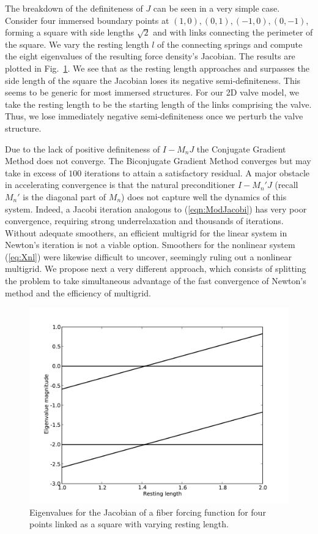 \documentclass[preprint,12pt]{elsarticle}
\begin{document}
The breakdown of the definiteness of $J$ can be seen in a very simple case. Consider four immersed boundary points at $(1,0),(0,1),(-1,0),(0,-1)$, forming a square with side lengths $\sqrt{2}$ and with links connecting the perimeter of the square. We vary the resting length $l$ of the connecting springs and compute the eight eigenvalues of the resulting force density's Jacobian. The results are plotted in
Fig.~\ref{fig:BoxEigenvalues}. We see that as the resting length approaches and surpasses the side length of the square the Jacobian loses its negative semi-definiteness. This seems to be generic
for most immersed structures. For our 2D valve model, we take the resting length to be the starting length of the links comprising the valve. Thus,  we  lose immediately negative semi-definiteness once we perturb the valve structure.

Due to the lack of positive definiteness of $I-M_nJ$  the Conjugate Gradient Method does not converge. The Biconjugate Gradient Method converges but may take in excess of $100$ iterations to attain a satisfactory residual. A major obstacle in accelerating convergence is that the natural preconditioner $I-M_n'J$ (recall $M_n'$ is the diagonal part of $M_n$) does not capture well the dynamics of this system. Indeed, a Jacobi iteration analogous to (\ref{eqn:ModJacobi}) has very poor convergence, requiring strong underrelaxation and thousands of iterations. Without adequate smoothers, an efficient  multigrid for the linear system in Newton's iteration is not a viable option. Smoothers for the nonlinear system (\ref{eq:Xnl}) were likewise difficult to uncover, seemingly ruling out a nonlinear multigrid. We propose next a very different approach,  which consists of splitting the 
problem to take simultaneous advantage of the fast convergence of Newton's method and the efficiency of multigrid. 
\begin{figure}[!b]
  \begin{center}
    \includegraphics[bb=.15in .15in 8in 6in,width=5.25in,clip]{BoxEigenvalues.pdf}
  \end{center}
  \caption{\small Eigenvalues for the Jacobian of a fiber forcing function for four points linked as a square with varying resting length.}
  \label{fig:BoxEigenvalues}
\end{figure}
\end{document}

